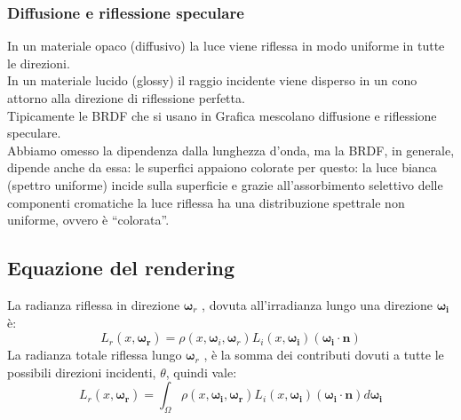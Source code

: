 \documentclass[a4paper, 10pt]{article}
\renewcommand{\vec}{\bm}
\begin{document}
		\subsubsection{Diffusione e riflessione speculare}
			In un materiale opaco (diffusivo) la luce viene riflessa in modo uniforme
			in tutte le direzioni. \\
			In un materiale lucido (glossy) il raggio incidente viene disperso in un cono attorno alla direzione di riflessione perfetta.\\
			Tipicamente le BRDF che si usano in Grafica mescolano
			diffusione e riflessione speculare.\\
			Abbiamo omesso la dipendenza dalla lunghezza d’onda, ma la
			BRDF, in generale, dipende anche da essa: le superfici appaiono
			colorate per questo: la luce bianca (spettro uniforme) incide
			sulla superficie e grazie all’assorbimento selettivo delle
			componenti cromatiche la luce riflessa ha una distribuzione
			spettrale non uniforme, ovvero è “colorata”.\\
		
	\subsection{Equazione del rendering}
		La radianza riflessa in direzione $ \vec{\omega}_r $ , dovuta all'irradianza lungo
		una direzione $ \vec{\omega_i} $ è:
		\[
			L_r(x, \vec{\omega_r}) = \rho(x,\vec{\omega}_i, \vec{\omega}_r)L_i (x, \vec{\omega_i} )(\vec{\omega_i} \cdot \vec{n})
		\]
		La radianza totale riflessa lungo $ \vec{\omega}_r $ , è la somma dei contributi
		dovuti a tutte le possibili direzioni incidenti, $ \theta $, quindi vale:
		\[
			L_r(x, \vec{\omega_r}) = \int_{\Omega} \rho(x, \vec{\omega_i}, \vec{\omega_r}) 
			L_i (x, \vec{\omega_i} )(\vec{\omega_i} \cdot \vec{n}) d\vec{\omega_i}
		\]
		
\end{document}
